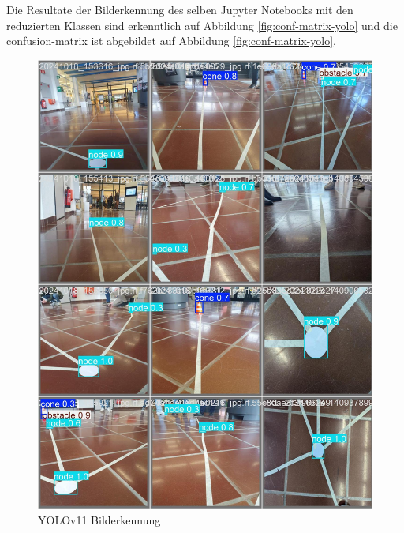 Die Resultate der Bilderkennung des selben Jupyter Notebooks mit den reduzierten Klassen sind erkenntlich auf Abbildung \ref{fig:conf-matrix-yolo} und die \gls{confusion-matrix} ist abgebildet auf Abbildung \ref{fig:conf-matrix-yolo}.

\begin{figure}[H]
\centering
\includegraphics[width=\textwidth -30mm]{assets/informatik-prototyp/yolo/recognized-images.jpeg}
\caption{YOLOv11 Bilderkennung}
\label{fig:img-recognition-yolo}
\end{figure}

